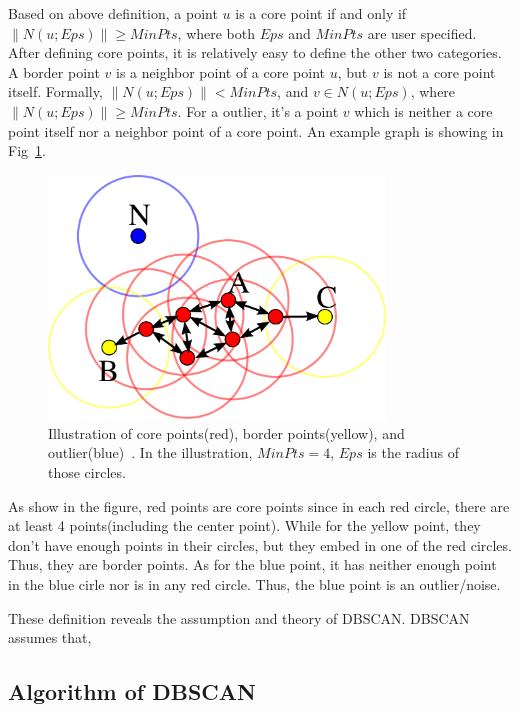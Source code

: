 Based on above definition, a point $u$ is a core point if and only if $\|N(u;Eps)\| \geq MinPts$, where both $Eps$ and $MinPts$ are user specified. After defining core points, it is relatively easy to define the other two categories. A border point $v$ is a neighbor point of a core point $u$, but $v$ is not a core point itself. Formally, $\|N(u;Eps)\| < MinPts$, and $v \in N(u;Eps)$, where $\|N(u;Eps)\| \geq MinPts$. For a outlier, it's a point $v$ which is neither a core point itself nor a neighbor point of a core point. An example graph is showing in Fig~\ref{fig:DBSCANConcept}.

\begin{figure}[ht]
	\begin{center}
		\includegraphics[width=0.8\textwidth]{images/DBSCAN-Illustration.png}
		\caption{Illustration of core points(red), border points(yellow), and outlier(blue)~\cite{wiki:DBSCAN}. In the illustration, $MinPts = 4$, $Eps$ is the radius of those circles.}
		\label{fig:DBSCANConcept}
	\end{center}
\end{figure}

As show in the figure, red points are core points since in each red circle, there are at least 4 points(including the center point). While for the yellow point, they don't have enough points in their circles, but they embed in one of the red circles. Thus, they are border points. As for the blue point, it has neither enough point in the blue cirle nor is in any red circle. Thus, the blue point is an outlier/noise.

These definition reveals the assumption and theory of DBSCAN. DBSCAN assumes that, 

\subsection{Algorithm of DBSCAN}
\label{subsec:DBSCANalgorithm}


